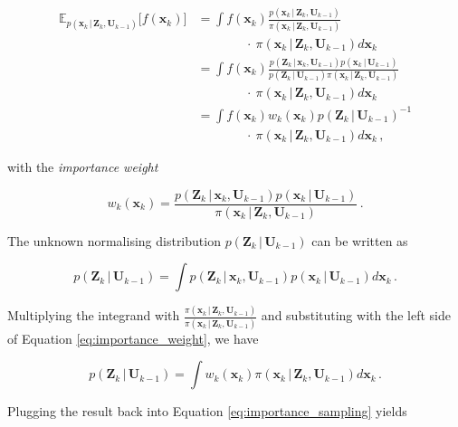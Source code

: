 \begin{equation}\label{eq:importance_sampling}
\begin{split}
  \mathbb{E}_{p(\bm{x}_k\,|\,\bm{Z}_{k}, \bm{U}_{k-1})}\big[f(\bm{x}_k)\big] &= \int f(\bm{x}_k) \frac{p(\bm{x}_k\,|\,\bm{Z}_{k}, \bm{U}_{k-1})}{\pi(\bm{x}_k\,|\,\bm{Z}_{k}, \bm{U}_{k-1})}  \\
  &\mathrel{\phantom{iiiiiiiiiii}} \cdot \: \pi(\bm{x}_k\,|\,\bm{Z}_{k}, \bm{U}_{k-1}) d\bm{x}_k \\
  &= \int f(\bm{x}_k) \frac{p(\bm{Z}_k\,|\,\bm{x}_{k}, \bm{U}_{k-1}) p(\bm{x}_{k}\,|\,\bm{U}_{k-1})}{p(\bm{Z}_{k}\,|\,\bm{U}_{k-1}) \pi(\bm{x}_k\,|\,\bm{Z}_{k}, \bm{U}_{k-1})} \\
  &\mathrel{\phantom{iiiiiiiiiii}} \cdot \: \pi(\bm{x}_k\,|\,\bm{Z}_{k}, \bm{U}_{k-1}) d\bm{x}_k \\
  &= \int f(\bm{x}_k) w_k(\bm{x}_k) p(\bm{Z}_k\,|\,\bm{U}_{k-1})^{-1} \\
  &\mathrel{\phantom{iiiiiiiiiii}} \cdot \: \pi(\bm{x}_k\,|\,\bm{Z}_{k}, \bm{U}_{k-1}) d\bm{x}_k\,,
\end{split}
\end{equation}

\noindent
with the \emph{importance weight}

\begin{equation}\label{eq:importance_weight}
  w_k(\bm{x}_k) = \frac{p(\bm{Z}_k\,|\,\bm{x}_{k}, \bm{U}_{k-1}) p(\bm{x}_{k}\,|\,\bm{U}_{k-1})}{\pi(\bm{x}_k\,|\,\bm{Z}_{k}, \bm{U}_{k-1})} \,.
\end{equation}

\noindent
The unknown normalising distribution $p(\bm{Z}_k\,|\,\bm{U}_{k-1})$ can be written as

\begin{equation}
  p(\bm{Z}_k\,|\,\bm{U}_{k-1}) = \int p(\bm{Z}_k\,|\,\bm{x}_{k}, \bm{U}_{k-1}) p(\bm{x}_{k}\,|\,\bm{U}_{k-1}) d\bm{x}_{k} \,.
\end{equation}

\noindent
Multiplying the integrand with $\frac{\pi(\bm{x}_k\,|\,\bm{Z}_{k}, \bm{U}_{k-1})}{\pi(\bm{x}_k\,|\,\bm{Z}_{k}, \bm{U}_{k-1})}$ and substituting with the left side of Equation \ref{eq:importance_weight}, we have

\begin{equation}
  p(\bm{Z}_k\,|\,\bm{U}_{k-1}) = \int w_k(\bm{x}_k) \pi(\bm{x}_k\,|\,\bm{Z}_{k}, \bm{U}_{k-1})d\bm{x}_{k} \,.
\end{equation}

\noindent
Plugging the result back into Equation \ref{eq:importance_sampling} yields

